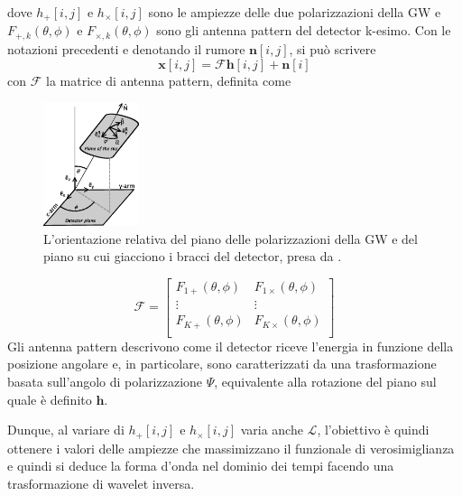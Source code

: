 dove $h_{+}[i,j]$ e $h_{\times}[i,j]$ sono le ampiezze delle due polarizzazioni della GW e $F_{+,k}(\theta,\phi)$ e $F_{\times,k}(\theta,\phi)$ sono gli antenna pattern del detector k-esimo\cite{Klimenko_2008}. Con le notazioni precedenti e denotando il rumore $\mathbf{n}[i,j]$, si può scrivere
\begin{equation}
	\mathbf{x}[i,j] = \mathcal{F}\mathbf{h}[i,j] + \mathbf{n}[i]
\end{equation}
con $\mathcal{F}$ la matrice di antenna pattern, definita come
\begin{figure}
	\vspace{-10pt}
	\begin{center}
		\includegraphics[width=0.25\textwidth]{figures/Capitolo_3/Detector_sky_full.eps}
	\end{center}
	\vspace{-5pt}
	\caption{L'orientazione relativa del piano delle polarizzazioni della GW e del piano su cui giacciono i bracci del detector, presa da \cite{Sathyaprakash_2009}.}
	\label{fig:antenna_pattern}
	\vspace{-30pt}
\end{figure}
\begin{equation}
	\mathcal{F} = \begin{bmatrix}
				     F_{1+}(\theta,\phi)	&F_{1\times}(\theta,\phi)\\
				     \vdots					&   \vdots				 \\
				     F_{K+}(\theta,\phi)	&F_{K\times}(\theta,\phi)\\
				  \end{bmatrix}
\end{equation}
Gli antenna pattern descrivono come il detector riceve l'energia in funzione della posizione angolare e, in particolare, sono caratterizzati da una trasformazione basata sull'angolo di polarizzazione $\Psi$, equivalente alla rotazione del piano sul quale è definito $\mathbf{h}$.

Dunque, al variare di $h_{+}[i,j]$ e $h_{\times}[i,j]$ varia anche $\mathcal{L}$, l'obiettivo è quindi ottenere i valori delle ampiezze che massimizzano il funzionale di verosimiglianza e quindi si deduce la forma d'onda nel dominio dei tempi facendo una trasformazione di wavelet inversa.%

